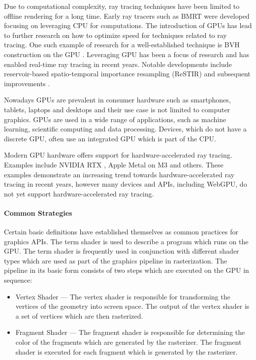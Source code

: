 Due to computational complexity, ray tracing techniques have been limited to offline rendering for a long time. Early ray tracers such as \gls{BMRT} were developed focusing on leveraging \gls{CPU} for computations. The introduction of \glspl{GPU} has lead to further research on how to optimize speed for techniques related to ray tracing. One such example of research for a well-established technique is \gls{BVH} construction on the \gls{GPU} \cite{lauterbach2009GPUbvh}. Leveraging \gls{GPU} has been a focus of research and has enabled real-time ray tracing in recent years. Notable developments include reservoir-based spatio-temporal importance resampling (ReSTIR) \cite{restir} and subsequent improvements \cite{restirAdvancements,restirGeneralized}.

Nowadays GPUs are prevalent in consumer hardware such as smartphones, tablets, laptops and desktops and their use case is not limited to computer graphics. GPUs are used in a wide range of applications, such as machine learning, scientific computing and data processing. Devices, which do not have a discrete GPU, often use an integrated GPU which is part of the CPU.

Modern GPU hardware offers support for hardware-accelerated ray tracing. Examples include NVIDIA RTX \cite{nvidiaRtxRayTracing}, Apple Metal on M3 \cite{appleM3GpuAdvancements} and others. These examples demonstrate an increasing trend towards hardware-accelerated ray tracing in recent years, however many devices and \glspl{API}, including \gls{WebGPU}, do not yet support hardware-accelerated ray tracing.

\paragraph{Common Strategies}
\label{sec:commonGpuStrategies}

Certain basic definitions have established themselves as common practices for graphics \glspl{API}. The term shader is used to describe a program which runs on the \gls{GPU}. The term shader is frequently used in conjunction with different shader types which are used as part of the graphics pipeline in rasterization. The pipeline in its basic form consists of two steps which are executed on the \gls{GPU} in sequence:

\begin{itemize}
    \item{Vertex Shader} — The vertex shader is responsible for transforming the vertices of the geometry into screen space. The output of the vertex shader is a set of vertices which are then rasterized.
    \item{Fragment Shader} — The fragment shader is responsible for determining the color of the fragments which are generated by the rasterizer. The fragment shader is executed for each fragment which is generated by the rasterizer.
\end{itemize}

